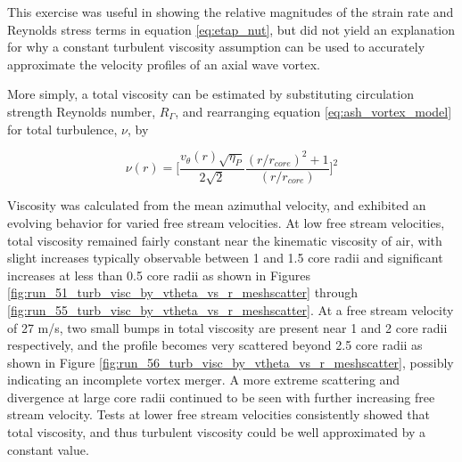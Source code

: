 

This exercise was useful in showing the relative magnitudes of the strain rate 
and Reynolds stress terms in equation \ref{eq:etap_nut}, but did not yield an 
explanation for why a constant turbulent viscosity assumption can be used to 
accurately approximate the velocity profiles of an axial wave vortex.

More simply, a total viscosity can be estimated by 
substituting circulation strength Reynolds number, $R_\Gamma$, and rearranging 
equation \ref{eq:ash_vortex_model} for total turbulence, $\nu$, by

\begin{equation}
\nu(r) = \Bigg[\frac{v_\theta(r) \sqrt{\eta_P}}{2 \sqrt{2}}
\frac{(r/r_{core})^2 + 1}{(r/r_{core})}\Bigg]^2
\label{eq:total_visc}
\end{equation}

Viscosity was calculated from the mean azimuthal velocity, and exhibited an 
evolving behavior for varied free stream velocities. At low free stream 
velocities, total viscosity remained fairly constant near the kinematic 
viscosity of air, with slight increases typically observable between 1 and 1.5 
core radii and significant increases at less than 0.5 core radii as shown in 
Figures 
\ref{fig:run_51_turb_visc_by_vtheta_vs_r_meshscatter} through 
\ref{fig:run_55_turb_visc_by_vtheta_vs_r_meshscatter}. At a free stream 
velocity of 27 m/s, two small bumps in total viscosity are present near 1 and 2 
core radii respectively, and the profile becomes very scattered beyond 2.5 core 
radii as shown in Figure \ref{fig:run_56_turb_visc_by_vtheta_vs_r_meshscatter}, 
possibly indicating an incomplete vortex merger. A more extreme scattering and 
divergence at large core radii continued to be seen with further increasing 
free stream velocity. Tests at lower free stream velocities consistently showed 
that total viscosity, and thus turbulent viscosity could be well approximated 
by a constant value. 












